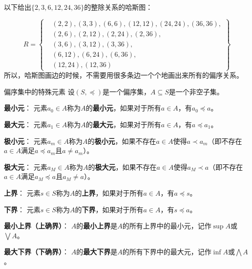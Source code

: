 \documentclass[lang=cn,11pt]{elegantbook}
\begin{document}
以下给出$\{2,3,6,12,24,36\}$的整除关系的哈斯图：
\begin{figure}[!ht]
\centering
{}%
\end{figure}
\[
R = \left\{
\begin{aligned}
& (2,2), (3,3), (6,6), (12,12), (24,24), (36,36), \\
& (2,6), (2,12), (2,24), (2,36), \\
& (3,6), (3,12), (3,36), \\
& (6,12), (6,24), (6,36), \\
& (12,24), (12,36)
\end{aligned}
\right\}
\]
所以，哈斯图画边的时候，不需要用很多条边一个个地画出来所有的偏序关系。
\begin{definition}{偏序集中的特殊元素}
设$(S, \preccurlyeq)$是一个偏序集，$A \subseteq S$是一个非空子集。

\textbf{最小元}：
元素$a_0 \in A$称为$A$的\textbf{最小元}，如果对于所有$a \in A$，有$a_0 \preccurlyeq a$。

\textbf{最大元}：
元素$a_1 \in A$称为$A$的\textbf{最大元}，如果对于所有$a \in A$，有$a \preccurlyeq a_1$。

\textbf{极小元}：
元素$a_m \in A$称为$A$的\textbf{极小元}，如果不存在$a \in A$使得$a \prec a_m$（即不存在$a \in A$满足$a \preccurlyeq a_m$且$a \neq a_m$）。

\textbf{极大元}：
元素$a_M \in A$称为$A$的\textbf{极大元}，如果不存在$a \in A$使得$a_M \prec a$（即不存在$a \in A$满足$a_M \preccurlyeq a$且$a_M \neq a$）。

\textbf{上界}：
元素$s \in S$称为$A$的\textbf{上界}，如果对于所有$a \in A$，有$a \preccurlyeq s$。

\textbf{下界}：
元素$s \in S$称为$A$的\textbf{下界}，如果对于所有$a \in A$，有$s \preccurlyeq a$。

\textbf{最小上界（上确界）}：
$A$的\textbf{最小上界}是$A$的所有上界中的最小元，记作$\sup A$或$\bigvee A$。

\textbf{最大下界（下确界）}：
$A$的\textbf{最大下界}是$A$的所有下界中的最大元，记作$\inf A$或$\bigwedge A$。
\end{definition}
\end{document}
